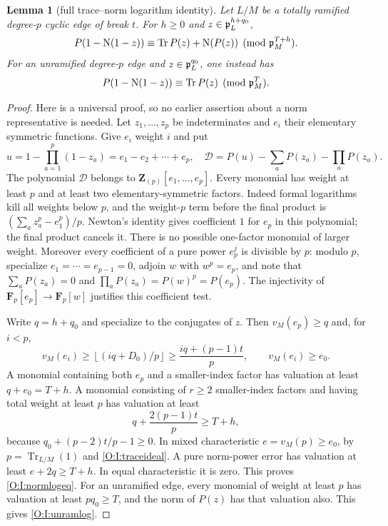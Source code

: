 \documentclass[11pt]{amsart}
\newtheorem{lemma}[theorem]{Lemma}
\theoremstyle{definition}
\theoremstyle{remark}
\newcommand{\F}{\mathbf F}
\newcommand{\Tr}{\operatorname{Tr}}
\newcommand{\Nm}{\operatorname{N}}
\newcommand{\floor}[1]{\left\lfloor #1\right\rfloor}
\begin{document}
\begin{lemma}[full trace--norm logarithm identity]\label{O:I:normlog}
Let $L/M$ be a totally ramified degree-$p$ cyclic edge of break $t$.
For $h\ge0$ and $z\in\mathfrak p_L^{h+q_0}$,
\begin{equation}\label{O:I:normlogeq}
 P(1-\Nm(1-z))\equiv
 \Tr P(z)+\Nm(P(z))\pmod{\pp_M^{T+h}}.
\end{equation}
For an unramified degree-$p$ edge and $z\in\mathfrak p_L^{q_0}$, one instead has
\begin{equation}\label{O:I:unramlog}
 P(1-\Nm(1-z))\equiv\Tr P(z)\pmod{\pp_M^T}.
\end{equation}
\end{lemma}
\begin{proof}
Here is a universal proof, so no earlier assertion about a norm
representative is needed. Let $z_1,\ldots,z_p$ be indeterminates and $e_i$
their elementary symmetric functions. Give $e_i$ weight $i$ and put
\[
 u=1-\prod_{a=1}^p(1-z_a)=e_1-e_2+\cdots+e_p,
\quad
 \mathscr D=P(u)-\sum_aP(z_a)-\prod_aP(z_a).
\]
The polynomial $\mathscr D$ belongs to
$\mathbf Z_{(p)}[e_1,\ldots,e_p]$. Every monomial has weight at least $p$
and at least two elementary-symmetric factors. Indeed formal logarithms
kill all weights below $p$, and the weight-$p$ term before the final product
is $(\sum_a z_a^p-e_1^p)/p$. Newton's identity gives coefficient $1$ for
$e_p$ in this polynomial; the final product cancels it. There is no possible
one-factor monomial of larger weight. Moreover every coefficient of a pure
power $e_p^j$ is divisible by $p$: modulo $p$, specialize
$e_1=\cdots=e_{p-1}=0$, adjoin $w$ with $w^p=e_p$, and note that
$\sum_aP(z_a)=0$ and $\prod_aP(z_a)=P(w)^p=P(e_p)$.
The injectivity of $\F_p[e_p]\to\F_p[w]$ justifies this coefficient test.

Write $q=h+q_0$ and specialize to the conjugates of $z$. Then
$v_M(e_p)\ge q$ and, for $i<p$,
\[
 v_M(e_i)\ge\floor{(iq+D_0)/p}
 \ge \frac{iq+(p-1)t}{p},\qquad v_M(e_i)\ge e_0.
\]
A monomial containing both $e_p$ and a smaller-index factor has valuation
at least $q+e_0=T+h$. A monomial consisting of $r\ge2$ smaller-index
factors and having total weight at least $p$ has valuation at least
\[
 q+\frac{2(p-1)t}{p}\ge T+h,
\]
because $q_0+(p-2)t/p-1\ge0$.
In mixed characteristic $e=v_M(p)\ge e_0$, by
$p=\Tr_{L/M}(1)$ and \eqref{O:I:traceideal}. A pure norm-power error has
valuation at least $e+2q\ge T+h$. In equal characteristic it is zero.
This proves \eqref{O:I:normlogeq}. For an unramified edge, every monomial of
weight at least $p$ has valuation at least $pq_0\ge T$, and the norm of
$P(z)$ has that valuation also. This gives \eqref{O:I:unramlog}.
\end{proof}
\end{document}
